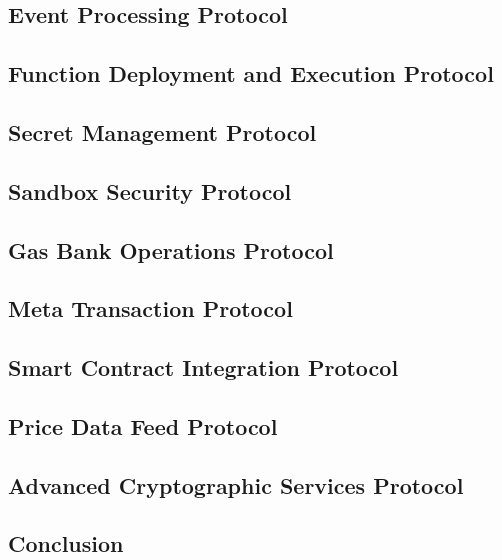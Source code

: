 \documentclass{article}
\begin{document}
\subsection{Event Processing Protocol}
\label{subsec:event-protocol}

\subsection{Function Deployment and Execution Protocol}
\label{subsec:function-protocol}

\subsection{Secret Management Protocol}
\label{subsec:secret-protocol}

\subsection{Sandbox Security Protocol}
\label{subsec:sandbox-protocol}

\subsection{Gas Bank Operations Protocol}
\label{subsec:gas-bank-protocol}

\subsection{Meta Transaction Protocol}
\label{subsec:meta-tx-protocol}

\subsection{Smart Contract Integration Protocol}
\label{subsec:smart-contract-protocol}

\subsection{Price Data Feed Protocol}
\label{subsec:price-feed-protocol}

\subsection{Advanced Cryptographic Services Protocol}
\label{subsec:advanced-crypto-protocol}

\subsection{Conclusion}
\label{subsec:nsl-conclusion}
\end{document}

